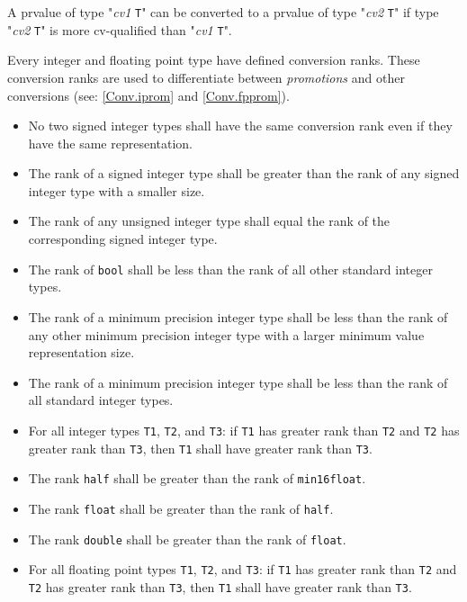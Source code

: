 
A prvalue of type "\textit{cv1} \texttt{T}" can be converted to a prvalue of type
"\textit{cv2} \texttt{T}" if type "\textit{cv2} \texttt{T}" is more cv-qualified
than "\textit{cv1} \texttt{T}".


\p Every integer and floating point type have defined conversion ranks. These
conversion ranks are used to differentiate between \textit{promotions} and other
conversions (see: \ref{Conv.iprom} and \ref{Conv.fpprom}).


\begin{itemize}
  \item  No two signed integer types shall have the same conversion rank even if
  they have the same representation.
  \item The rank of a signed integer type shall be greater than the rank of any
  signed integer type with a smaller size.
  \item The rank of any unsigned integer type shall equal the rank of the
  corresponding signed integer type.
  \item The rank of \texttt{bool} shall be less than the rank of all other
  standard integer types.
  \item The rank of a minimum precision integer type shall be less than the rank
  of any other minimum precision integer type with a larger minimum value
  representation size.
  \item The rank of a minimum precision integer type shall be less than the rank
  of all standard integer types.
  \item For all integer types \texttt{T1}, \texttt{T2}, and \texttt{T3}: if
  \texttt{T1} has greater rank than \texttt{T2} and \texttt{T2} has greater rank
  than \texttt{T3}, then \texttt{T1} shall have greater rank than \texttt{T3}.
\end{itemize}


\begin{itemize}
  \item The rank \texttt{half} shall be greater than the rank of \texttt{min16float}.
  \item The rank \texttt{float} shall be greater than the rank of \texttt{half}.
  \item The rank \texttt{double} shall be greater than the rank of \texttt{float}.
  \item For all floating point types \texttt{T1}, \texttt{T2}, and \texttt{T3}:
  if \texttt{T1} has greater rank than \texttt{T2} and \texttt{T2} has greater
  rank than \texttt{T3}, then \texttt{T1} shall have greater rank than
  \texttt{T3}.
\end{itemize}
